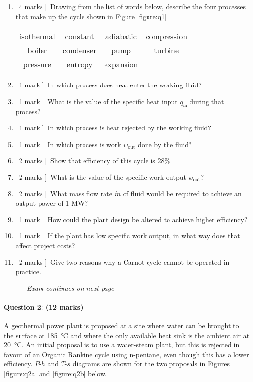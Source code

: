 \documentclass[a4paper,12pt,fleqn]{article}
\newcommand{\middlewords}{Exam continues on next page}
\begin{document}
\begin{enumerate}[label=\alph*)]
\item \lbrack\ 4 marks ]\ Drawing from the list of words below, describe the four processes that make up the cycle shown in Figure \ref{figure:q1}\par
\begin{table}[h]
\centering
\begin{tabular}{c c c c}
isothermal & constant & adiabatic & compression\\
boiler & condenser & pump & turbine \\
pressure & entropy & expansion&\\
\end{tabular}
\end{table}
\item \lbrack\ 1 mark ]\ In which process does heat enter the working fluid?
\item \lbrack\ 1 mark ]\ What is the value of the specific heat input $q_\mathrm{in}$ during that process?
\item \lbrack\ 1 mark ]\ In which process is heat rejected by the working fluid?
\item \lbrack\ 1 mark ]\ In which process is work $w_\mathrm{out}$ done by the fluid?
\item \lbrack\ 2 marks ]\ Show that efficiency of this cycle is 28\%
\item \lbrack\ 2 marks ]\ What is the value of the specific work output $w_\mathrm{out}$?
\item \lbrack\ 2 marks ]\ What mass flow rate $\dot m$ of fluid would be required to achieve an output power of 1 MW?
\item \lbrack\ 1 mark ]\ How could the plant design be altered to achieve higher efficiency?
\item \lbrack\ 1 mark ]\ If the plant has low specific work output, in what way does that affect project costs?
\item \lbrack\ 2 marks ]\ Give two reasons why a Carnot cycle cannot be operated in practice.
\end{enumerate}

\begin{center}
\vspace{3cm}
--------- \textit{\middlewords} ---------
\end{center}
\newpage
\paragraph{\textbf{Question 2: (12 marks)}}
A geothermal power plant is proposed at a site where water can be brought to the surface at \SI{185}{\celsius} and where the only available heat sink is the ambient air at \SI{20}{\celsius}. An initial proposal is to use a water-steam plant, but this is rejected in favour of an Organic Rankine cycle using n-pentane, even though this has a lower efficiency.
$P$-$h$ and $T$-$s$ diagrams are shown for the two proposals in Figures \ref{figure:q2a} and \ref{figure:q2b} below.
\end{document}
